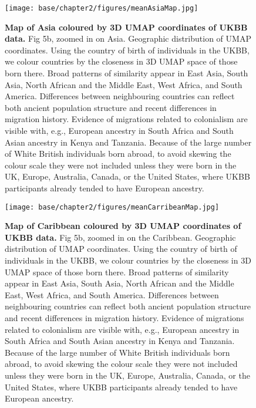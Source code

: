 \begin{figure}[ht]
    \centering
    \texttt{[image: base/chapter2/figures/meanAsiaMap.jpg]}
    \caption[Map of Asia coloured by 3D UMAP coordinates of UKBB data]{\textbf{Map of Asia coloured by 3D UMAP coordinates of UKBB data.} Fig 5b, zoomed in on Asia. Geographic distribution of UMAP coordinates. Using the country of birth of individuals in the UKBB, we colour countries by the closeness in 3D UMAP space of those born there. Broad patterns of similarity appear in East Asia, South Asia, North African and the Middle East, West Africa, and South America. Differences between neighbouring countries can reflect both ancient population structure and recent differences in migration history. Evidence of migrations related to colonialism are visible with, e.g., European ancestry in South Africa and South Asian ancestry in Kenya and Tanzania. Because of the large number of White British individuals born abroad, to avoid skewing the colour scale they were not included unless they were born in the UK, Europe, Australia, Canada, or the United States, where UKBB participants already tended to have European ancestry.}
    \label{fig:supp_umap_ukbb_asia}
\end{figure}

\newpage

\begin{figure}[ht]
    \centering
    \texttt{[image: base/chapter2/figures/meanCarribeanMap.jpg]}
    \caption[Map of Caribbean coloured by 3D UMAP coordinates of UKBB data]{\textbf{Map of Caribbean coloured by 3D UMAP coordinates of UKBB data.} Fig 5b, zoomed in on the Caribbean. Geographic distribution of UMAP coordinates. Using the country of birth of individuals in the UKBB, we colour countries by the closeness in 3D UMAP space of those born there. Broad patterns of similarity appear in East Asia, South Asia, North African and the Middle East, West Africa, and South America. Differences between neighbouring countries can reflect both ancient population structure and recent differences in migration history. Evidence of migrations related to colonialism are visible with, e.g., European ancestry in South Africa and South Asian ancestry in Kenya and Tanzania. Because of the large number of White British individuals born abroad, to avoid skewing the colour scale they were not included unless they were born in the UK, Europe, Australia, Canada, or the United States, where UKBB participants already tended to have European ancestry.}
    \label{fig:supp_umap_ukbb_car}
\end{figure}


